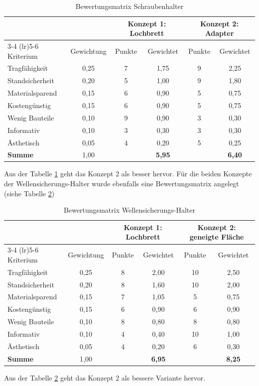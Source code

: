 \begin{table}[H]
	\centering
	\caption{Bewertungsmatrix Schraubenhalter}
	\label{tab:bewertung_schraubenhalter}
	\begin{tabular}{l c cc cc}
		\toprule
		& & \multicolumn{2}{c}{Konzept 1: Lochbrett} & \multicolumn{2}{c}{Konzept 2: Adapter} \\
		\cmidrule(lr){3-4} \cmidrule(lr){5-6}
		Kriterium & Gewichtung & Punkte & Gewichtet & Punkte & Gewichtet \\
		\midrule
		Tragfähigkeit   & 0,25 & 7 & 1,75 & 9 & 2,25 \\
		Standsicherheit & 0,20 & 5 & 1,00 & 9 & 1,80\\
		Materialsparend & 0,15 & 6 & 0,90 & 5 & 0,75\\
		Kostengünstig   & 0,15 & 6 & 0,90 & 5 & 0,75\\
		Wenig Bauteile  & 0,10 & 9 & 0,90 & 3 & 0,30\\
		Informativ      & 0,10 & 3 & 0,30 & 3 & 0,30\\
		Ästhetisch      & 0,05 & 4 & 0,20 & 5 & 0,25\\
		\midrule
		\textbf{Summe}  & 1,00 & & \textbf{5,95} & & \textbf{6,40} \\
		\bottomrule
	\end{tabular}
\end{table}

Aus der Tabelle \ref{tab:bewertung_schraubenhalter} geht das Konzept 2 als besser hervor. Für die beiden Konzepte der Wellensicherungs-Halter wurde ebenfalls eine Bewertungsmatrix angelegt (siehe Tabelle \ref{tab:bewertung_wellensicherung})

\begin{table}[H]
	\centering
	\caption{Bewertungsmatrix Wellensicherungs-Halter}
	\label{tab:bewertung_wellensicherung}
	\begin{tabular}{l c cc cc}
		\toprule
		& & \multicolumn{2}{c}{Konzept 1: Lochbrett} & \multicolumn{2}{c}{Konzept 2: geneigte Fläche} \\
		\cmidrule(lr){3-4} \cmidrule(lr){5-6}
		Kriterium & Gewichtung & Punkte & Gewichtet & Punkte & Gewichtet \\
		\midrule
		Tragfähigkeit   & 0,25 & 8 & 2,00 & 10 & 2,50 \\
		Standsicherheit & 0,20 & 8 & 1,60 & 10 & 2,00\\
		Materialsparend & 0,15 & 7 & 1,05 & 5 & 0,75\\
		Kostengünstig   & 0,15 & 6 & 0,90 & 6 & 0,90\\
		Wenig Bauteile  & 0,10 & 8 & 0,80 & 8 & 0,80\\
		Informativ      & 0,10 & 4 & 0,40 & 10 & 1,00\\
		Ästhetisch      & 0,05 & 4 & 0,20 & 6 & 0,30\\
		\midrule
		\textbf{Summe}  & 1,00 & & \textbf{6,95} & & \textbf{8,25} \\
		\bottomrule
	\end{tabular}
\end{table}

Aus der Tabelle \ref{tab:bewertung_wellensicherung} geht das Konzept 2 als bessere Variante hervor.